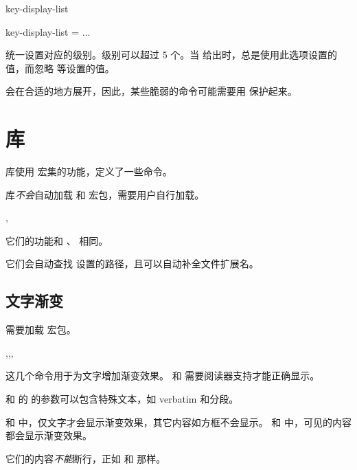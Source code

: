 \documentclass{cusdoc}
\begin{document}
\begin{keyval}[path=index-kv]{key-display-list}
  \begin{syntax}
    key-display-list = ...
  \end{syntax}
统一设置对应的级别。级别可以超过 5 个。当  给出时，总是使用此选项设置的值，而忽略  等设置的值。

会在合适的地方展开，因此，某些脆弱的命令可能需要用  保护起来。
\end{keyval}


\section{库}

 库使用  宏集的功能，定义了一些命令。

 库\emph{不会}自动加载  和  宏包，需要用户自行加载。

\begin{function}{\pgfdeclareimagep,\pgfimagep}
  \begin{syntax}
    \V\pgfdeclareimagep {}  
    \V\pgfimagep {} 
  \end{syntax}
它们的功能和 、 相同。

它们会自动查找  设置的路径，且可以自动补全文件扩展名。
\end{function}

\subsection{文字渐变}

需要加载  宏包。

\begin{function}{\shadetext,\shadetextbox,\shadecontent,\shadecontentbox}
  \begin{syntax}
    \V\shadetext    {} 
    \V\shadetextbox {} 
    \V\shadecontent    {}  
    \V\shadecontentbox {}  
  \end{syntax}
这几个命令用于为文字增加渐变效果。 和 
需要阅读器支持才能正确显示。

 和  的  的参数可以包含特殊文本，如 
verbatim 和分段。

 和  中，仅文字才会显示渐变效果，其它内容如方框不会显示。
 和  中，可见的内容都会显示渐变效果。

它们的内容\emph{不能}断行，正如  和  那样。
\end{function}
\end{document}
